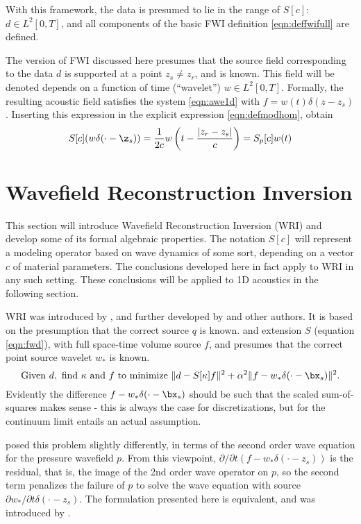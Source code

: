 With this framework, the data is presumed to lie in the range of $S[c]$: $d \in L^2[0,T]$, and all components of the basic FWI definition \ref{eqn:deffwifull} are defined.

The version of FWI discussed here presumes that the source field corresponding to the data $d$ is supported at a point $z_s \ne z_r$, and is known. This field will be denoted depends on a function of time (``wavelet'') $w \in L^2[0,T]$. Formally, the resulting acoustic field satisfies the system \ref{eqn:awe1d} with $f=w(t)\delta(z-z_s)$. Inserting this expression in the explicit expression \ref{eqn:defmodhom}, obtain
\begin{equation}
  \label{eqn:defmodpt}
  S[c](w\delta(\cdot-\z_s)) = \frac{1}{2c}w\left(t - \frac{|z_r-z_s|}{c}\right) = S_p[c]w(t)
\end{equation}




\section{Wavefield Reconstruction Inversion}
This section will introduce Wavefield Reconstruction Inversion (WRI) and develop some of its formal algebraic properties. The notation $S[c]$ will represent a modeling operator based on wave dynamics of some sort, depending on a vector $c$ of material parameters. The conclusions developed here in fact apply to WRI in any such setting. These conclusions will be applied to 1D acoustics in the following section.

WRI was introduced by \cite{LeeuwenHerrmannWRI:13}, and further
developed by \cite{LeeuwenHerrmann:16,WangYingst:SEG16} and other
authors. It is based on the presumption that the correct source $q$ is known.  and extension $S$ (equation \ref{eqn:fwd}), with full
space-time volume source $f$, and presumes that the correct point
source wavelet $w_*$ is known. 
\begin{equation}
  \label{eqn:defwri}
  \mbox{Given } d, \mbox{ find }\kappa \mbox{ and }f \mbox{ to
    minimize }
  \| d -  S[\kappa]f\|^2+\alpha^2\|f-w_*\delta(\cdot-\bx_s)\|^2.
\end{equation}
Evidently the difference $f-w_*\delta(\cdot-\bx_s)$ should be such
that the scaled sum-of-squares makes sense - this is always the case
for discretizations, but for the continuum limit entails an actual
assumption.

\cite{LeeuwenHerrmannWRI:13} posed this problem slightly
differently, in terms of the second order wave equation for the
pressure wavefield $p$. From this viewpoint, $\partial/\partial t(f-w_*\delta(\cdot-z_s))$ is the residual, that is, the image of the 2nd order wave operator on $p$, so the second term penalizes the failure of $p$ to solve the wave equation with source $\partial w_*/\partial t \delta(\cdot-z_s)$. The formulation presented here is equivalent, and was
introduced by \cite{WangYingst:SEG16}.

